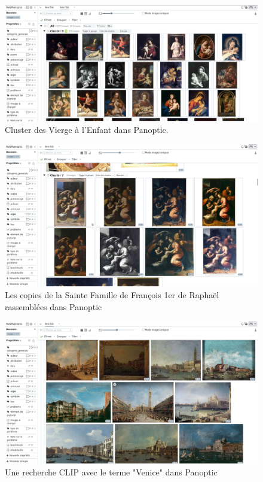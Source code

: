 \begin{figure}[H]
    \centering
    \includegraphics[width=1\textwidth]{annexes/figures/Pa-Vierges.png}
    \caption{Cluster des Vierge à l'Enfant dans Panoptic.}
    \label{fig:Pa-Vierges}
\end{figure}

\begin{figure}[H]
    \centering
    \includegraphics[width=1\textwidth]{annexes/figures/Pa-F1er.png}
    \caption{Les copies de la Sainte Famille de François 1er de Raphaël rassemblées dans Panoptic}
    \label{fig:Pa-F1er}
\end{figure}

\begin{figure}[H]
    \centering
    \includegraphics[width=1\textwidth]{annexes/figures/Pa-Venice.png}
    \caption{Une recherche CLIP avec le terme "Venice" dans Panoptic}
    \label{fig:Pa-Venice}
\end{figure}


